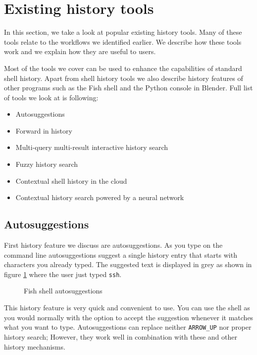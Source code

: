 \section{Existing history tools}

In this section, we take a look at popular existing history tools. Many of these tools relate to the workflows we identified earlier. We describe how these tools work and we explain how they are useful to users. 

Most of the tools we cover can be used to enhance the capabilities of standard shell history. Apart from shell history tools we also describe history features of other programs such as the Fish shell\cite{fishdocs} and the Python console in Blender\cite{tools-blender-docs-python-console}. Full list of tools we look at is following:

\begin{itemize}
    \item Autosuggestions
    \item Forward in history
    \item Multi-query multi-result interactive history search
    \item Fuzzy history search
    \item Contextual shell history in the cloud
    \item Contextual history search powered by a neural network
\end{itemize}

\subsection{Autosuggestions}

First history feature we discuss are autosuggestions. As you type on the command line autosuggestions suggest a single history entry that starts with characters you already typed. The suggested text is displayed in grey as shown in figure \ref{fish-autosuggestions} where the user just typed \verb|ssh|.  


\begin{figure}[h!]
  \caption{Fish shell autosuggestions}
  \label{fish-autosuggestions}
\end{figure}


This history feature is very quick and convenient to use. You can use the shell as you would normally with the option to accept the suggestion whenever it matches what you want to type. Autosuggestions can replace neither \verb|ARROW_UP| nor proper history search; However, they work well in combination with these and other history mechanisms.

